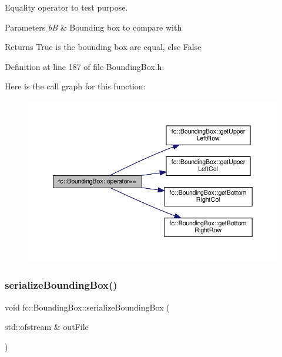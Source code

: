 Equality operator to test purpose. 


\begin{DoxyParams}{Parameters}
{\em bB} & Bounding box to compare with \\
\hline
\end{DoxyParams}
\begin{DoxyReturn}{Returns}
True is the bounding box are equal, else False 
\end{DoxyReturn}


Definition at line 187 of file Bounding\+Box.\+h.

Here is the call graph for this function\+:
\nopagebreak
\begin{figure}[H]
\begin{center}
\leavevmode
\includegraphics[width=350pt]{db/dc1/classfc_1_1BoundingBox_a2a1f28a0e0cd0a8b6041ba8e9c0f9b4f_cgraph}
\end{center}
\end{figure}
\mbox{\label{classfc_1_1BoundingBox_ae2174abc444c26d86763567ed31c5094}} 
\subsubsection{\texorpdfstring{serialize\+Bounding\+Box()}{serializeBoundingBox()}}
{\footnotesize\ttfamily void fc\+::\+Bounding\+Box\+::serialize\+Bounding\+Box (\begin{DoxyParamCaption}\item[{std\+::ofstream \&}]{out\+File }\end{DoxyParamCaption})\hspace{0.3cm}{\ttfamily [inline]}}



